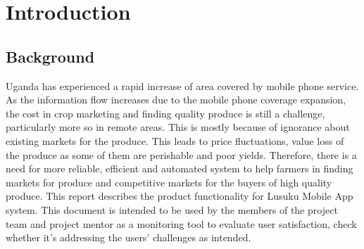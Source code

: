 \chapter{Introduction}

\section{Background}
Uganda has experienced a rapid increase of area covered by mobile phone service. As the information flow increases due to the mobile phone coverage expansion, the cost in crop marketing and finding quality produce is still a challenge, particularly more so in remote areas. This is mostly because of ignorance about existing markets for the produce. This leads to price fluctuations, value loss of the produce as some of them are perishable and poor yields.
Therefore, there is a need for more reliable, efficient and automated system to help farmers in finding markets for produce and competitive markets for the buyers of high quality produce. This report describes the product functionality for Lusuku Mobile App system. This document is intended to be used by the members of the project team and project mentor as a monitoring tool to evaluate user satisfaction, check whether it’s addressing the users’ challenges as intended.

